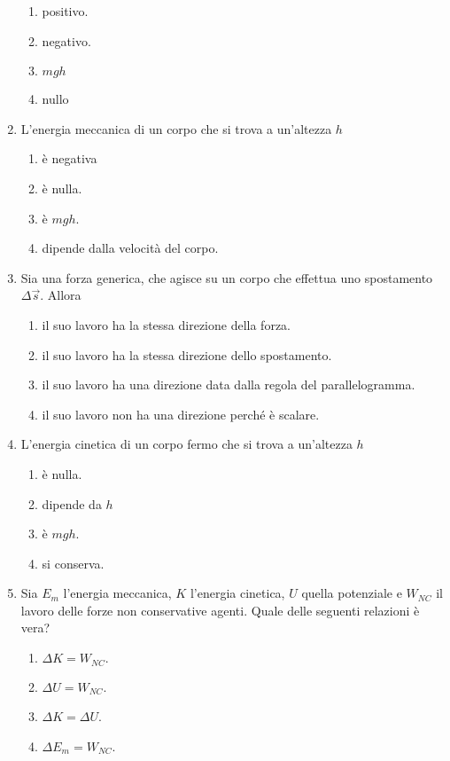 \documentclass{article}
\begin{document}
\begin{enumerate}
  \begin{enumerate}[label=\Alph*.]
    \item positivo.
    \item negativo.
    \item $mgh$
    \item nullo
  \end{enumerate}
  \item L'energia meccanica di un corpo che si trova a un'altezza $h$
  \begin{enumerate}[label=\Alph*.]
    \item è negativa
    \item è nulla.
    \item è $mgh$.
    \item dipende dalla velocità del corpo.
  \end{enumerate}
  \item Sia  una forza generica, che agisce su un corpo che effettua uno spostamento $\Delta \vec{s}$. Allora
  \begin{enumerate}[label=\Alph*.]
    \item il suo lavoro ha la stessa direzione della forza.
    \item il suo lavoro ha la stessa direzione dello spostamento.
    \item il suo lavoro ha una direzione data dalla regola del parallelogramma.
    \item il suo lavoro non ha una direzione perché è scalare.
  \end{enumerate}
  \item L'energia cinetica di un corpo fermo che si trova a un'altezza $h$
  \begin{enumerate}[label=\Alph*.]
    \item è nulla.
    \item dipende da $h$
    \item è $mgh$.
    \item si conserva.
  \end{enumerate}
  \item Sia $E_m$ l'energia meccanica, $K$ l'energia cinetica, $U$ quella potenziale e $W_{NC}$ il lavoro delle forze non conservative agenti. Quale delle seguenti relazioni è vera?
  \begin{enumerate}[label=\Alph*.]
    \item $\Delta K=W_{NC}.$
    \item $\Delta U=W_{NC}$.
    \item $\Delta K = \Delta U$.
    \item $\Delta E_m=W_{NC}$.

\end{enumerate}
\end{enumerate}
\end{document}
